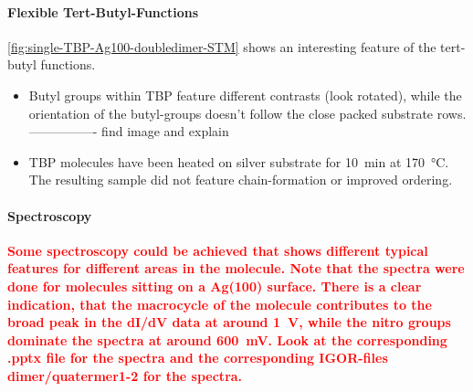 \paragraph{Flexible Tert-Butyl-Functions}
\autoref{fig:single-TBP-Ag100-doubledimer-STM} shows an interesting feature of the tert-butyl functions.

\begin{itemize}
 \item Butyl groups within TBP feature different contrasts (look rotated), while the orientation of the butyl-groups doesn't follow the close packed substrate rows. ---------------- find image and explain
 \item TBP molecules have been heated on silver substrate for \SI{10}{\minute} at \SI{170}{\celsius}. The resulting sample did not feature chain-formation or improved ordering.
\end{itemize}


\paragraph{Spectroscopy}
\textcolor{red}{\textbf{
Some spectroscopy could be achieved that shows different typical features for different areas in the molecule. Note that the spectra were done for molecules sitting on a Ag(100) surface.
There is a clear indication, that the macrocycle of the molecule contributes to the broad peak in the dI/dV data at around \SI{1}{\V}, while the nitro groups dominate the spectra at around \SI{600}{\milli \V}. 
Look at the corresponding .pptx file for the spectra and the corresponding IGOR-files dimer/quatermer1-2 for the spectra.
}}
